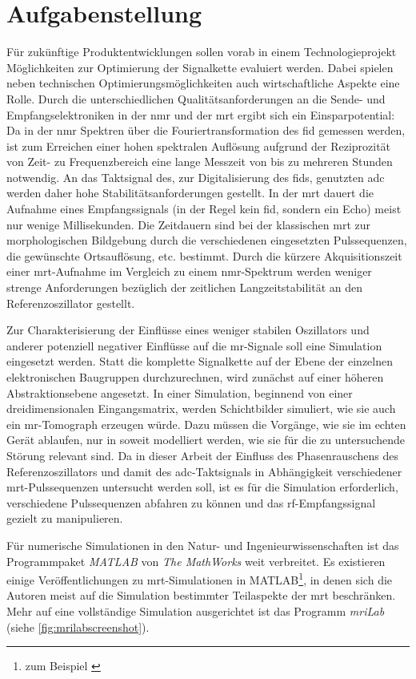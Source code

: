\section{Aufgabenstellung}
Für zukünftige Produktentwicklungen sollen vorab in einem Technologie\-projekt Möglich\-keiten zur Optimierung der Signalkette evaluiert werden. Dabei spielen neben technischen Optimierungsmöglichkeiten auch wirtschaftliche Aspekte eine Rolle.
Durch die unterschiedlichen Qualitätsanforderungen an die Sende- und Empfangselektroniken in der \gls{nmr} und der \gls{mrt} ergibt sich ein Einsparpotential: Da in der \gls{nmr} Spektren über die Fouriertransformation des \gls{fid} gemessen werden, ist zum Erreichen einer hohen spektralen Auflösung aufgrund der Reziprozität von Zeit- zu Frequenzbereich eine lange Messzeit von bis zu mehreren Stunden notwendig. An das Taktsignal des, zur Digitalisierung des \gls{fid}s, genutzten \gls{adc} werden daher hohe Stabilitätsanforderungen gestellt. In der \gls{mrt} dauert die Aufnahme eines Empfangssignals (in der Regel kein \gls{fid}, sondern ein Echo) meist nur wenige Millisekunden. Die Zeitdauern sind bei der klassischen \gls{mrt} zur morphologischen Bildgebung durch die verschiedenen eingesetzten Pulssequenzen, die gewünschte Ortsauflösung, etc. bestimmt.
Durch die kürzere Akquisitionszeit einer \gls{mrt}-Aufnahme im Vergleich zu einem \gls{nmr}-Spektrum werden weniger strenge Anforderungen bezüglich der zeitlichen Langzeitstabilität an den Referenzoszillator gestellt.

Zur Charakterisierung der Einflüsse eines weniger stabilen Oszillators und anderer potenziell negativer Einflüsse auf die \gls{mr}-Signale soll eine Simulation eingesetzt werden. Statt die komplette Signalkette auf der Ebene der einzelnen elektronischen Baugruppen durchzurechnen, wird zunächst auf einer höheren Abstraktionsebene angesetzt. In einer Simulation, beginnend von einer dreidimensionalen Eingangsmatrix, werden Schichtbilder simuliert, wie sie auch ein \gls{mr}-Tomograph erzeugen würde. Dazu müssen die Vorgänge, wie sie im echten Gerät ablaufen, nur in soweit modelliert werden, wie sie für die zu untersuchende Störung relevant sind. Da in dieser Arbeit der Einfluss des Phasenrauschens des Referenzoszillators und damit des \gls{adc}-Taktsignals in Abhängigkeit verschiedener \gls{mrt}-Pulssequenzen untersucht werden soll, ist es für die Simulation erforderlich, verschiedene Pulssequenzen abfahren zu können und das \gls{rf}-Empfangssignal gezielt zu manipulieren.

Für numerische Simulationen in den Natur- und Ingenieurwissenschaften ist das Programmpaket \textit{MATLAB}\cite{matlab} von \textit{The MathWorks} weit verbreitet. Es existieren einige Ver\-öffent\-lichungen zu \gls{mrt}-Simulationen in MATLAB\footnote{zum Beispiel \cite{Kern2012}}, in denen sich die Autoren meist auf die Simulation bestimmter Teilaspekte der \gls{mrt} beschränken. Mehr auf eine vollständige Simulation ausgerichtet ist das Programm \textit{\gls{mr}iLab}\cite{Liu2017} (siehe \autoref{fig:mrilabscreenshot}).

